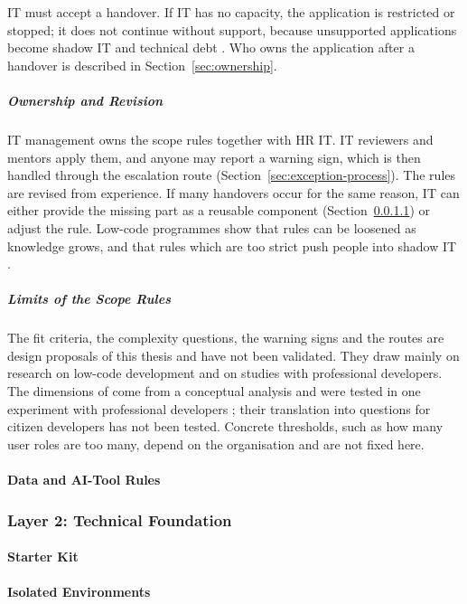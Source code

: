 \documentclass[10pt,a4paper]{article}
\begin{document}
IT must accept a handover. If IT has no capacity, the application is
restricted or stopped; it does not continue without support, because
unsupported applications become shadow IT and technical debt
\parencite{viljoen2024}. Who owns the application after a handover is
described in Section~\ref{sec:ownership}.

\subparagraph{Ownership and Revision}

IT management owns the scope rules together with HR IT. IT reviewers
and mentors apply them, and anyone may report a warning sign, which is
then handled through the escalation route
(Section~\ref{sec:exception-process}). The rules are revised from
experience. If many handovers occur for the same reason, IT can either
provide the missing part as a reusable component
(Section~\ref{sec:starter-kit}) or adjust the rule. Low-code programmes
show that rules can be loosened as knowledge grows, and that rules
which are too strict push people into shadow IT \parencite{binzer2024}.

\subparagraph{Limits of the Scope Rules}

The fit criteria, the complexity questions, the warning signs and the
routes are design proposals of this thesis and have not been
validated. They draw mainly on research on low-code development and on
studies with professional developers. The dimensions of
\textcite{alaswad2026framework} come from a conceptual analysis and
were tested in one experiment with professional developers
\parencite{alaswad2026hybrid}; their translation into questions for
citizen developers has not been tested. Concrete thresholds, such as
how many user roles are too many, depend on the organisation and are
not fixed here.

\paragraph{Data and AI-Tool Rules}
\label{sec:data-tool-rules}

\subsubsection{Layer 2: Technical Foundation}
\label{sec:layer2}

\paragraph{Starter Kit}
\label{sec:starter-kit}

\paragraph{Isolated Environments}
\label{sec:environments}
\end{document}
